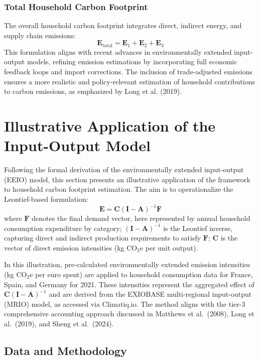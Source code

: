 \documentclass[12pt,a4paper]{article}%
\begin{document}
\subsubsection*{Total Household Carbon Footprint}
The overall household carbon footprint integrates direct, indirect energy, and supply chain emissions:
\begin{equation}
    \mathbf{E}_{\text{total}} = \mathbf{E}_1 + \mathbf{E}_2 + \mathbf{E}_3
\end{equation}
This formulation aligns with recent advances in environmentally extended input-output models, refining emission estimations by incorporating full economic feedback loops and import corrections. The inclusion of trade-adjusted emissions ensures a more realistic and policy-relevant estimation of household contributions to carbon emissions, as emphasized by Long et al. (2019).
\section{Illustrative Application of the Input-Output Model}

Following the formal derivation of the environmentally extended input-output (EEIO) model, this section presents an illustrative application of the framework to household carbon footprint estimation. The aim is to operationalize the Leontief-based formulation:
\[
\mathbf{E} = \mathbf{C} {(\mathbf{I}-\mathbf{A})}^{-1} \mathbf{F}
\]
where $\mathbf{F}$ denotes the final demand vector, here represented by annual household consumption expenditure by category; ${(\mathbf{I}-\mathbf{A})}^{-1}$ is the Leontief inverse, capturing direct and indirect production requirements to satisfy $\mathbf{F}$; $\mathbf{C}$ is the vector of direct emission intensities (kg CO$_{2}$e per unit output).

In this illustration, pre-calculated environmentally extended emission intensities (kg CO$_{2}$e per euro spent) are applied to household consumption data for France, Spain, and Germany for 2021. These intensities represent the aggregated effect of $\mathbf{C} {(\mathbf{I}-\mathbf{A})}^{-1}$ and are derived from the EXIOBASE multi-regional input-output (MRIO) model, as accessed via Climatiq.io. The method aligns with the tier-3 comprehensive accounting approach discussed in Matthews et al.~(2008), Long et al.~(2019), and Sheng et al.~(2024).

\subsection{Data and Methodology}
\end{document}
